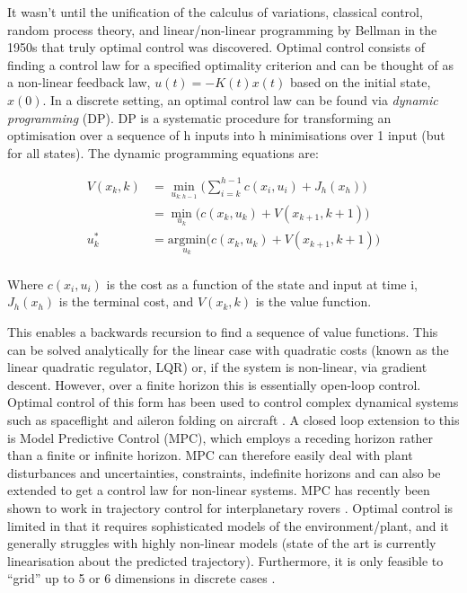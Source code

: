 \documentclass[../main.tex]{subfiles}
\begin{document}
It wasn't until the unification of the calculus of variations, classical control, random process theory, and linear/non-linear programming by Bellman in the 1950s \cite{History} that truly optimal control was discovered. Optimal control consists of finding a control law for a specified optimality criterion and can be thought of as a non-linear feedback law, $u(t) = -K(t)x(t)$ based on the initial state, $x(0)$. In a discrete setting, an optimal control law can be found via \textit{dynamic programming} (DP). DP is a systematic procedure for transforming an optimisation over a sequence of h inputs into h minimisations over 1 input (but for all states). The dynamic programming equations are:

\begin{align}
    \label{equ:detval} 
    V(x_k, k) & = \underset{u_{k:h-1}}{\min} \bigg( \sum_{i=k}^{h-1} c(x_i, u_i) + J_h(x_h) \bigg) \\ 
    & = \underset{u_k}{\min} \Big( c(x_k, u_k) + V(x_{k+1}, k+1) \Big) \\
    u^{*}_k & = \underset{u_k}{\text{argmin}} \Big( c(x_k, u_k) + V(x_{k+1}, k+1) \Big) \\
\end{align}

Where $c(x_i, u_i)$ is the cost as a function of the state and input at time i, $J_h(x_h)$ is the terminal cost, and $V(x_k, k)$ is the value function.

This enables a backwards recursion to find a sequence of value functions. This can be solved analytically for the linear case with quadratic costs (known as the linear quadratic regulator, LQR) or, if the system is non-linear, via gradient descent. However, over a finite horizon this is essentially open-loop control. Optimal control of this form has been used to control complex dynamical systems such as spaceflight and aileron folding on aircraft \cite{aircraftoptcont, aileronoptcont}. A closed loop extension to this is Model Predictive Control (MPC), which employs a receding horizon rather than a finite or infinite horizon. MPC can therefore easily deal with plant disturbances and uncertainties, constraints, indefinite horizons and can also be extended to get a control law for non-linear systems. MPC has recently been shown to work in trajectory control for interplanetary rovers \cite{rovermpc}. Optimal control is limited in that it requires sophisticated models of the environment/plant, and it generally struggles with highly non-linear models (state of the art is currently linearisation about the predicted trajectory). Furthermore, it is only feasible to ``grid'' up to 5 or 6 dimensions in discrete cases \cite{4f3}.
\end{document}
